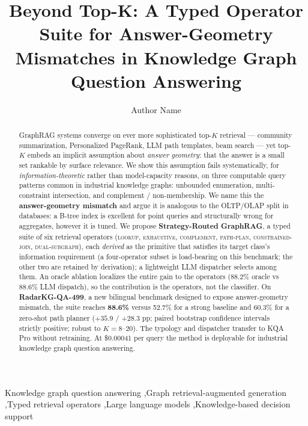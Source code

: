 \documentclass[review]{elsarticle}
\newcommand{\op}[1]{\textsc{\small #1}}
\begin{document}
\begin{frontmatter}

\title{Beyond Top-K: A Typed Operator Suite for Answer-Geometry Mismatches in Knowledge Graph Question Answering}

\author{Author Name}


\begin{abstract}
GraphRAG systems converge on ever more sophisticated top-$K$ retrieval --- community summarization, Personalized PageRank, LLM path templates, beam search --- yet top-$K$ embeds an implicit assumption about \emph{answer geometry}: that the answer is a small set rankable by surface relevance. We show this assumption fails systematically, for \emph{information-theoretic} rather than model-capacity reasons, on three computable query patterns common in industrial knowledge graphs: unbounded enumeration, multi-constraint intersection, and complement / non-membership. We name this the \textbf{answer-geometry mismatch} and argue it is analogous to the OLTP/OLAP split in databases: a B-tree index is excellent for point queries and structurally wrong for aggregates, however it is tuned. We propose \textbf{Strategy-Routed GraphRAG}, a typed suite of six retrieval operators (\op{lookup}, \op{exhaustive}, \op{complement}, \op{path-plan}, \op{constrained-join}, \op{dual-subgraph}), each \emph{derived} as the primitive that satisfies its target class's information requirement (a four-operator subset is load-bearing on this benchmark; the other two are retained by derivation); a lightweight LLM dispatcher selects among them. An oracle ablation localizes the entire gain to the operators (88.2\% oracle vs 88.6\% LLM dispatch), so the contribution is the operators, not the classifier. On \textbf{RadarKG-QA-499}, a new bilingual benchmark designed to expose answer-geometry mismatch, the suite reaches \textbf{88.6\%} versus 52.7\% for a strong baseline and 60.3\% for a zero-shot path planner ($+35.9$ / $+28.3$ pp; paired bootstrap confidence intervals strictly positive; robust to $K{=}8$--$20$). The typology and dispatcher transfer to KQA Pro without retraining. At \$0.00041 per query the method is deployable for industrial knowledge graph question answering.
\end{abstract}

\begin{keyword}
Knowledge graph question answering \sep Graph retrieval-augmented generation \sep Typed retrieval operators \sep Large language models \sep Knowledge-based decision support
\end{keyword}

\end{frontmatter}
\end{document}
